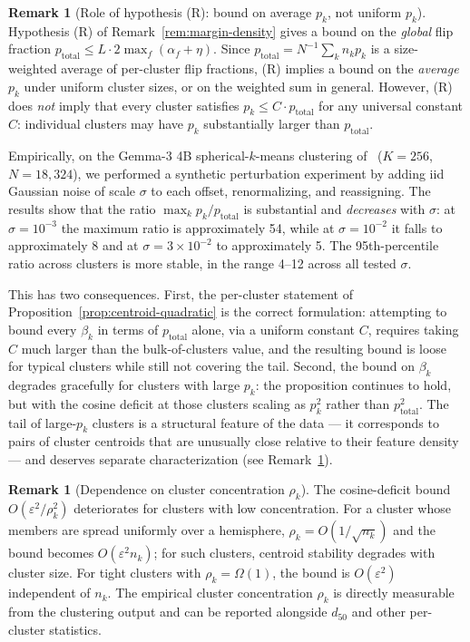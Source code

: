 \documentclass[11pt,letterpaper]{article}
\theoremstyle{definition}
\newtheorem{remark}[theorem]{Remark}
\begin{document}
\begin{remark}[Role of hypothesis (R): bound on average $p_k$, not uniform $p_k$]
\label{rem:R-and-pk}
Hypothesis (R) of Remark~\ref{rem:margin-density} gives a bound on the \emph{global} flip fraction $p_{\mathrm{total}} \leq L \cdot 2 \max_f (\alpha_f + \eta)$. Since $p_{\mathrm{total}} = N^{-1} \sum_k n_k p_k$ is a size-weighted average of per-cluster flip fractions, (R) implies a bound on the \emph{average} $p_k$ under uniform cluster sizes, or on the weighted sum in general. However, (R) does \emph{not} imply that every cluster satisfies $p_k \leq C \cdot p_{\mathrm{total}}$ for any universal constant $C$: individual clusters may have $p_k$ substantially larger than $p_{\mathrm{total}}$.

Empirically, on the Gemma-3 4B spherical-$k$-means clustering of~\citep{cluster_size_confound} ($K = 256$, $N = 18{,}324$), we performed a synthetic perturbation experiment by adding iid Gaussian noise of scale $\sigma$ to each offset, renormalizing, and reassigning. The results show that the ratio $\max_k p_k / p_{\mathrm{total}}$ is substantial and \emph{decreases} with $\sigma$: at $\sigma = 10^{-3}$ the maximum ratio is approximately 54, while at $\sigma = 10^{-2}$ it falls to approximately 8 and at $\sigma = 3 \times 10^{-2}$ to approximately 5. The 95th-percentile ratio across clusters is more stable, in the range 4--12 across all tested $\sigma$.

This has two consequences. First, the per-cluster statement of Proposition~\ref{prop:centroid-quadratic} is the correct formulation: attempting to bound every $\beta_k$ in terms of $p_{\mathrm{total}}$ alone, via a uniform constant $C$, requires taking $C$ much larger than the bulk-of-clusters value, and the resulting bound is loose for typical clusters while still not covering the tail. Second, the bound on $\beta_k$ degrades gracefully for clusters with large $p_k$: the proposition continues to hold, but with the cosine deficit at those clusters scaling as $p_k^2$ rather than $p_{\mathrm{total}}^2$. The tail of large-$p_k$ clusters is a structural feature of the data --- it corresponds to pairs of cluster centroids that are unusually close relative to their feature density --- and deserves separate characterization (see Remark~\ref{rem:rho-dependence}).
\end{remark}

\begin{remark}[Dependence on cluster concentration $\rho_k$]
\label{rem:rho-dependence}
The cosine-deficit bound $O(\varepsilon^2 / \rho_k^2)$ deteriorates for clusters with low concentration. For a cluster whose members are spread uniformly over a hemisphere, $\rho_k = O(1/\sqrt{n_k})$ and the bound becomes $O(\varepsilon^2 n_k)$; for such clusters, centroid stability degrades with cluster size. For tight clusters with $\rho_k = \Omega(1)$, the bound is $O(\varepsilon^2)$ independent of $n_k$. The empirical cluster concentration $\rho_k$ is directly measurable from the clustering output and can be reported alongside $d_{50}$ and other per-cluster statistics.
\end{remark}
\end{document}
